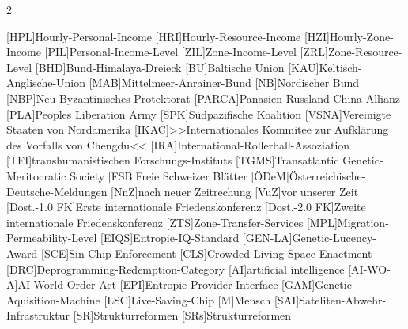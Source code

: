 \begin{multicols}{2}
  \setlength{\multicolsep}{0pt}
  \setlength{\columnsep}{2em}
\begin{acronym}[Dost.-1.0 FK]
	[HPL]{Hourly-Personal-Income}
	[HRI]{Hourly-Resource-Income}
	[HZI]{Hourly-Zone-Income}
	[PIL]{Personal-Income-Level}
	[ZIL]{Zone-Income-Level}
	[ZRL]{Zone-Resource-Level}
  [BHD]{Bund-Himalaya-Dreieck}
  [BU]{Baltische Union}
	[KAU]{Keltisch-Anglische-Union}
	[MAB]{Mittelmeer-Anrainer-Bund}
	[NB]{Nordischer Bund}
  [NBP]{Neu-Byzantinisches Protektorat}
	[PARCA]{Panasien-Russland-China-Allianz}
	[PLA]{Peoples Liberation Army}
	[SPK]{Südpazifische Koalition}
	[VSNA]{Vereinigte Staaten von Nordamerika}
  [IKAC]{>>Internationales Kommitee zur Aufklärung des Vorfalls von Chengdu<<}
  [IRA]{International-Rollerball-Assoziation}
	[TFI]{transhumanistischen Forschungs-Instituts}
	[TGMS]{Transatlantic Genetic-Meritocratic Society}
  [FSB]{Freie Schweizer Blätter}
  [ÖDeM]{Österreichische-Deutsche-Meldungen}
	[NnZ]{nach neuer Zeitrechung}
	[VuZ]{vor unserer Zeit}
	[Dost.-1.0 FK]{Erste internationale Friedenskonferenz}
	[Dost.-2.0 FK]{Zweite internationale Friedenskonferenz}
  [ZTS]{Zone-Transfer-Services}
  [MPL]{Migration-Permeability-Level}
  [EIQS]{Entropie-IQ-Standard}
  [GEN-LA]{Genetic-Lucency-Award}
  [SCE]{Sin-Chip-Enforcement}
  [CLS]{Crowded-Living-Space-Enactment}
  [DRC]{Deprogramming-Redemption-Category}
  [AI]{artificial intelligence}
  [AI-WO-A]{AI-World-Order-Act}
	[EPI]{Entropie-Provider-Interface}
	[GAM]{Genetic-Aquisition-Machine}
	[LSC]{Live-Saving-Chip}
	{Mensch}
	[SAI]{Sateliten-Abwehr-Infrastruktur}
	[SR]{Strukturreformen}
	[SRs]{Strukturreformen}
\end{acronym}
\end{multicols}
